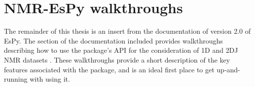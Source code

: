 \chapter{NMR-EsPy walkthroughs}
\label{chap:walkthrough}
The remainder of this thesis is an insert from the documentation of
version 2.0 of \acs{EsPy}. The section of the documentation included provides
walkthroughs describing how to use the package's \ac{API} for the consideration
of \ac{1D} and \ac{2DJ} \ac{NMR} datasets . These
walkthroughs provide a short description of the key features associated with
the package, and is an ideal first place to get up-and-running with using it.

{}


{}

